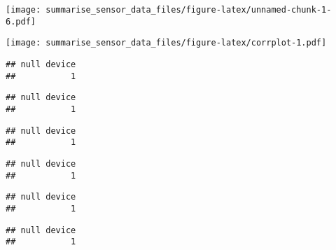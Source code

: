 \documentclass[]{article}
\begin{document}
\texttt{[image: summarise\_sensor\_data\_files/figure-latex/unnamed-chunk-1-6.pdf]}

\texttt{[image: summarise\_sensor\_data\_files/figure-latex/corrplot-1.pdf]}

\begin{verbatim}
## null device 
##           1
\end{verbatim}

\begin{verbatim}
## null device 
##           1
\end{verbatim}

\begin{verbatim}
## null device 
##           1
\end{verbatim}

\begin{verbatim}
## null device 
##           1
\end{verbatim}

\begin{verbatim}
## null device 
##           1
\end{verbatim}

\begin{verbatim}
## null device 
##           1
\end{verbatim}
\end{document}

